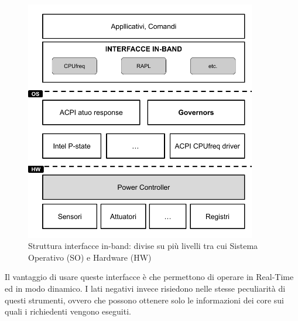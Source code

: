 \begin{figure}[H]
    \centering
    \includegraphics[width=0.9\textwidth]{img/in-band.png}
    \caption{Struttura interfacce in-band: divise su più livelli tra cui Sistema Operativo (SO) e Hardware (HW) } 
    \label{fig:inband}
\end{figure}

Il vantaggio di usare queste interfacce è che permettono di operare in Real-Time ed in modo dinamico. I lati negativi invece risiedono nelle stesse peculiarità di questi strumenti, ovvero che possono ottenere solo le informazioni dei core sui quali i richiedenti vengono eseguiti. 




